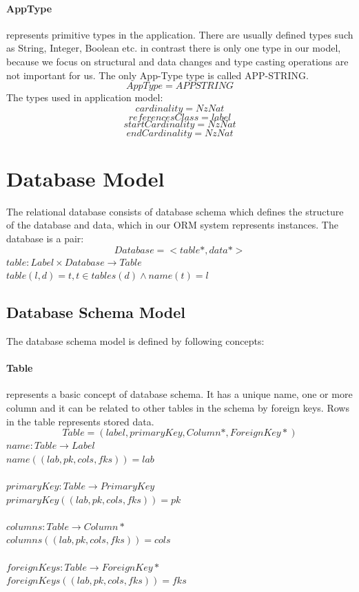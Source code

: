 \documentclass[11pt]{article}
\begin{document}
\paragraph{AppType} represents primitive types in the application. There are usually defined types such as String, Integer, Boolean etc. in contrast there is only one type in our model, because we focus on structural and data changes and type casting operations are not important for us. The only App-Type type is called APP-STRING.
$$
AppType = APPSTRING
$$
The types used in application model:
$$
cardinality = NzNat
$$
$$
referencesClass = label
$$
$$
startCardinality = NzNat
$$
$$
endCardinality = NzNat
$$


\section{Database Model}
The relational database consists of database schema which defines the structure of the database and data, which in our ORM system represents instances. The database is a pair:
$$
Database = <table*, data*>
$$
$table : Label \times Database \rightarrow Table $ \\
$table(l, d) = t, t \in tables(d) \wedge name(t) = l$ \\

\subsection{Database Schema Model}
The database schema model is defined by following concepts:
\paragraph{Table} represents a basic concept of database schema. It has a unique name, one or more column and it can be related to other tables in the schema by foreign keys. Rows in the table represents stored data.
$$
Table = (label, primaryKey, Column*, ForeignKey*)
$$
$name : Table \rightarrow Label $ \\
$name((lab, pk, cols, fks)) = lab$ \\ \\
$primaryKey : Table \rightarrow PrimaryKey $ \\
$primaryKey((lab, pk, cols, fks)) = pk$ \\ \\
$columns : Table \rightarrow Column* $ \\
$columns((lab, pk, cols, fks)) = cols$ \\ \\
$foreignKeys : Table \rightarrow ForeignKey* $ \\
$foreignKeys((lab, pk, cols, fks)) = fks$ 
\end{document}
